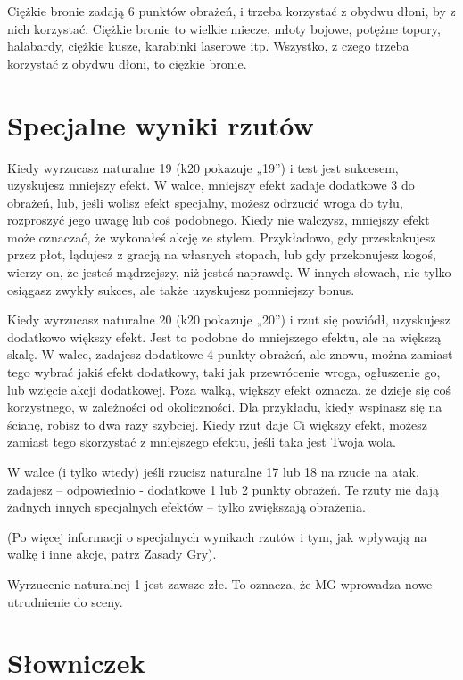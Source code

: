 Ciężkie bronie zadają 6 punktów obrażeń, i trzeba korzystać z obydwu dłoni, by z nich korzystać. Ciężkie bronie to wielkie miecze, młoty bojowe, potężne topory, halabardy, ciężkie kusze, karabinki laserowe itp. Wszystko, z czego trzeba korzystać z obydwu dłoni, to ciężkie bronie.

\section {Specjalne wyniki rzutów}

Kiedy wyrzucasz naturalne 19 (k20 pokazuje „19”) i test jest sukcesem, uzyskujesz mniejszy efekt. W walce, mniejszy efekt zadaje dodatkowe 3 do obrażeń, lub, jeśli wolisz efekt specjalny, możesz odrzucić wroga do tyłu, rozproszyć jego uwagę lub coś podobnego. Kiedy nie walczysz, mniejszy efekt może oznaczać, że wykonałeś akcję ze stylem. Przykładowo, gdy przeskakujesz przez płot, lądujesz z gracją na własnych stopach, lub gdy przekonujesz kogoś, wierzy on, że jesteś mądrzejszy, niż jesteś naprawdę. W innych słowach, nie tylko osiągasz zwykły sukces, ale także uzyskujesz pomniejszy bonus. 

Kiedy wyrzucasz naturalne 20 (k20 pokazuje „20”) i rzut się powiódł, uzyskujesz dodatkowo większy efekt. Jest to podobne do mniejszego efektu, ale na większą skalę. W walce, zadajesz dodatkowe 4 punkty obrażeń, ale znowu, można zamiast tego wybrać jakiś efekt dodatkowy, taki jak przewrócenie wroga, ogłuszenie go, lub wzięcie akcji dodatkowej. Poza walką, większy efekt oznacza, że dzieje się coś korzystnego, w zależności od okoliczności. Dla przykładu, kiedy wspinasz się na ścianę, robisz to dwa razy szybciej. Kiedy rzut daje Ci większy efekt, możesz zamiast tego skorzystać z mniejszego efektu, jeśli taka jest Twoja wola.

W walce (i tylko wtedy) jeśli rzucisz naturalne 17 lub 18 na rzucie na atak, zadajesz – odpowiednio - dodatkowe 1 lub 2 punkty obrażeń. Te rzuty nie dają żadnych innych specjalnych efektów – tylko zwiększają obrażenia.

(Po więcej informacji o specjalnych wynikach rzutów i tym, jak wpływają na walkę i inne akcje, patrz Zasady Gry).

Wyrzucenie naturalnej 1 jest zawsze złe. To oznacza, że MG wprowadza nowe utrudnienie do sceny. 

\section {Słowniczek}

